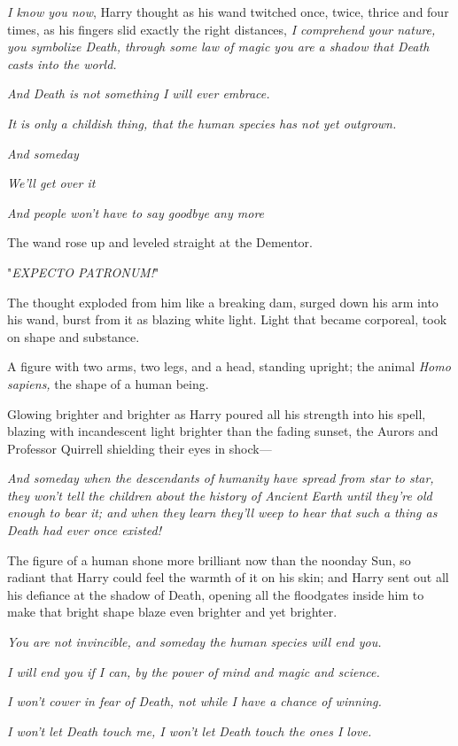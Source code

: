 \emph{I know you now}, Harry thought as his wand twitched once, twice, thrice
and four times, as his fingers slid exactly the right distances, \emph{I
comprehend your nature, you symbolize Death, through some law of magic you are
a shadow that Death casts into the world.}

\emph{And Death is not something I will ever embrace.}

\emph{It is only a childish thing, that the human species has not yet outgrown.}

\emph{And someday{\el}}

\emph{We'll get over it{\el}}

\emph{And people won't have to say goodbye any more{\el}}

The wand rose up and leveled straight at the Dementor.

"\emph{EXPECTO PATRONUM!}"

The thought exploded from him like a breaking dam, surged down his arm into his
wand, burst from it as blazing white light. Light that became corporeal, took
on shape and substance.

A figure with two arms, two legs, and a head, standing upright; the animal
\emph{Homo sapiens,} the shape of a human being.

Glowing brighter and brighter as Harry poured all his strength into his spell,
blazing with incandescent light brighter than the fading sunset, the Aurors and
Professor Quirrell shielding their eyes in shock---

\emph{And someday when the descendants of humanity have spread from star to
star, they won't tell the children about the history of Ancient Earth until
they're old enough to bear it; and when they learn they'll weep to hear that
such a thing as Death had ever once existed!}

The figure of a human shone more brilliant now than the noonday Sun, so radiant
that Harry could feel the warmth of it on his skin; and Harry sent out all his
defiance at the shadow of Death, opening all the floodgates inside him to make
that bright shape blaze even brighter and yet brighter.

\emph{You are not invincible, and someday the human species will end you.}

\emph{I will end you if I can, by the power of mind and magic and science.}

\emph{I won't cower in fear of Death, not while I have a chance of winning.}

\emph{I won't let Death touch me, I won't let Death touch the ones I love.}

